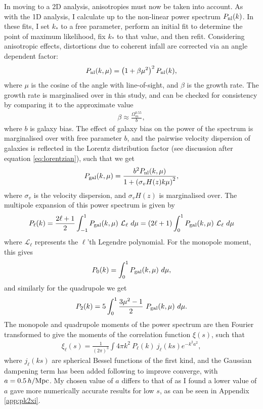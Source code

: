 \documentclass[titlesmallcaps, examinerscopy, copyrightpage]{uqthesis}
\begin{document}
In moving to a 2D analysis, anisotropies must now be taken into account. As with the 1D analysis, I calculate up to the non-linear power spectrum $P_{\rm{nl}}(k)$. In these fits, I set $k_*$ to a free parameter, perform an initial fit to determine the point of maximum likelihood, fix $k_*$ to that value, and then refit. Considering anisotropic effects, distortions due to coherent infall are corrected via an angle dependent factor:
\begin{align}
P_{\rm{nl}}(k, \mu) = \left(1 + \beta \mu^2\right)^2 P_{\text{nl}}(k),
\end{align}
where $\mu$ is the cosine of the angle with line-of-sight, and $\beta$ is the growth rate. The growth rate is marginalised over in this study, and can be checked for consistency by comparing it to the approximate value
\begin{align}
\beta \approx \frac{\Omega_m^{0.55}}{b},
\end{align}
where $b$ is galaxy bias. The effect of galaxy bias on the power of the spectrum is marginalised over with free parameter $b$, and the pairwise velocity dispersion of galaxies is reflected in the Lorentz distribution factor (see discussion after equation \ref{eq:lorentzian}), such that we get
\begin{align}
P_{\rm{gal}}(k, \mu) = \frac{b^2 P_{\rm{nl}}(k, \mu)}{1 + \left(\sigma_v H(z) k \mu\right)^2},
\end{align} 
where $\sigma_v$ is the velocity dispersion, and $\sigma_v H(z)$ is marginalised over. The multipole expansion of this power spectrum is given by
\begin{align}
P_{\ell}(k) = \frac{2\ell + 1}{2} \int_{-1}^1 P_{\rm{gal}}(k, \mu) \ \mathcal{L}_\ell \  d\mu = (2\ell + 1) \int_{0}^1 P_{\rm{gal}}(k, \mu) \ \mathcal{L}_\ell \  d\mu
\end{align}
where $\mathcal{L}_\ell$ represents the $\ell$'th Legendre polynomial. For the monopole moment, this gives
\begin{align}
P_0(k) = \int_0^1 P_{\rm{gal}}(k, \mu) \  d\mu,
\end{align}
 and similarly for the quadrupole we get
\begin{align}
P_2(k) = 5 \int_0^1 \frac{3\mu^2 - 1}{2}\  P_{\rm{gal}}(k, \mu)\  d\mu.
\end{align}
The monopole and quadrupole moments of the power spectrum are then Fourier transformed to give the moments of the correlation function $\xi(s)$, such that
\begin{align}
\xi_\ell(s) = \frac{1}{(2\pi)^3} \int 4\pi k^2 \ P_\ell(k) \ j_\ell(ks) e^{-k^2 a^2},
\end{align}
where $j_\ell(ks)$ are spherical Bessel functions of the first kind, and the Gaussian dampening term has been added following \citet{AndersonAubourg2012} to improve converge, with $a= 0.5\, h/\rm{Mpc}$. My chosen value of $a$ differs to that of \citet{AndersonAubourg2012} as I found a lower value of $a$ gave more numerically accurate results for low $s$, as can be seen in Appendix \ref{app:pk2xi}.
\end{document}
